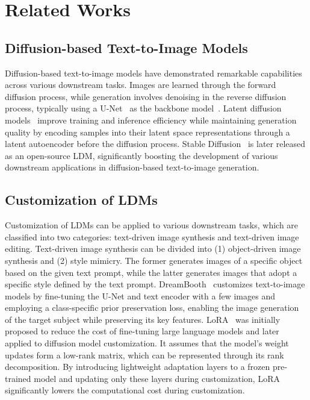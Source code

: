 \section{Related Works}
\subsection{Diffusion-based Text-to-Image Models}
Diffusion-based text-to-image models have demonstrated remarkable capabilities across various downstream tasks. 
Images are learned through the forward diffusion process, while generation involves denoising in the reverse diffusion process, typically using a U-Net~\cite{ronneberger2015u} as the backbone model~\cite{ho2020denoising}.
Latent diffusion models~\cite{rombach2022high} improve training and inference efficiency while maintaining generation quality by encoding samples into their latent space representations through a latent autoencoder before the diffusion process.
Stable Diffusion~\cite{stablediffusion} is later released as an open-source LDM, significantly boosting the development of various downstream applications in diffusion-based text-to-image generation.


\subsection{Customization of LDMs}
Customization of LDMs can be applied to various downstream tasks, which are classified into two categories: text-driven image synthesis and text-driven image editing.  
Text-driven image synthesis can be divided into (1) object-driven image synthesis and (2) style mimicry. 
The former generates images of a specific object based on the given text prompt, while the latter generates images that adopt a specific style defined by the text prompt.
DreamBooth~\cite{ruiz2023dreambooth} customizes text-to-image models by fine-tuning the U-Net and text encoder with a few images and employing a class-specific prior preservation loss, enabling the image generation of the target subject while preserving its key features.
LoRA~\cite{hu2022lora} was initially proposed to reduce the cost of fine-tuning large language models and later applied to diffusion model customization. 
It assumes that the model's weight updates form a low-rank matrix, which can be represented through its rank decomposition. 
By introducing lightweight adaptation layers to a frozen pre-trained model and updating only these layers during customization, LoRA significantly lowers the computational cost during customization.


